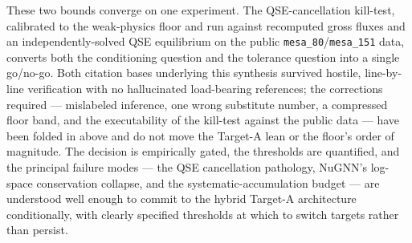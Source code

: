 \documentclass[11pt]{article}
\begin{document}
These two bounds converge on one experiment. The QSE-cancellation kill-test, calibrated to the weak-physics floor and run against recomputed gross fluxes and an independently-solved QSE equilibrium on the public \texttt{mesa\_80}/\texttt{mesa\_151} data, converts both the conditioning question and the tolerance question into a single go/no-go. Both citation bases underlying this synthesis survived hostile, line-by-line verification with no hallucinated load-bearing references; the corrections required --- mislabeled inference, one wrong substitute number, a compressed floor band, and the executability of the kill-test against the public data --- have been folded in above and do not move the Target-A lean or the floor's order of magnitude. The decision is empirically gated, the thresholds are quantified, and the principal failure modes --- the QSE cancellation pathology, NuGNN's log-space conservation collapse, and the systematic-accumulation budget --- are understood well enough to commit to the hybrid Target-A architecture conditionally, with clearly specified thresholds at which to switch targets rather than persist.
\end{document}
